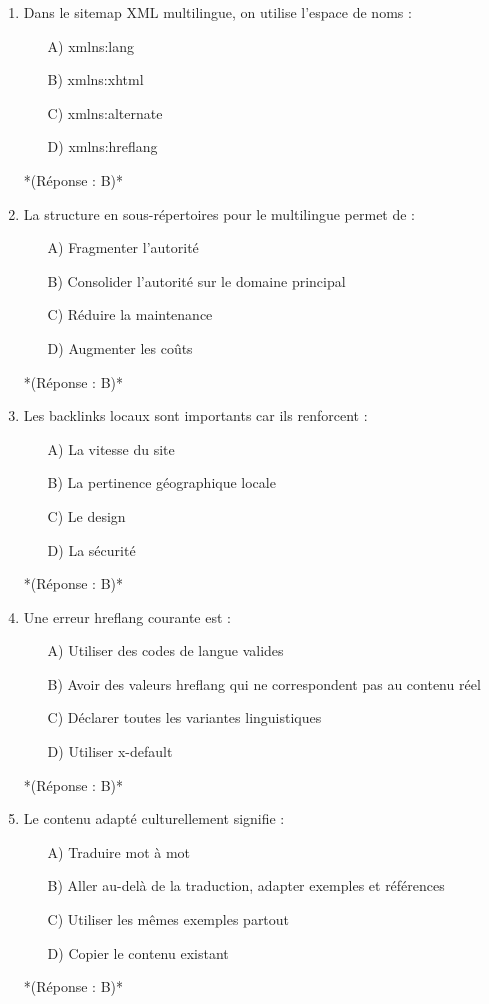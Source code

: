 \documentclass[12pt,a4paper,twoside]{report}
\begin{document}
\begin{enumerate}
\item Dans le sitemap XML multilingue, on utilise l'espace de noms :
\begin{itemize}
\item[A)] xmlns:lang
\item[B)] xmlns:xhtml
\item[C)] xmlns:alternate
\item[D)] xmlns:hreflang
\end{itemize}
*(Réponse : B)*

\item La structure en sous-répertoires pour le multilingue permet de :
\begin{itemize}
\item[A)] Fragmenter l'autorité
\item[B)] Consolider l'autorité sur le domaine principal
\item[C)] Réduire la maintenance
\item[D)] Augmenter les coûts
\end{itemize}
*(Réponse : B)*

\item Les backlinks locaux sont importants car ils renforcent :
\begin{itemize}
\item[A)] La vitesse du site
\item[B)] La pertinence géographique locale
\item[C)] Le design
\item[D)] La sécurité
\end{itemize}
*(Réponse : B)*

\item Une erreur hreflang courante est :
\begin{itemize}
\item[A)] Utiliser des codes de langue valides
\item[B)] Avoir des valeurs hreflang qui ne correspondent pas au contenu réel
\item[C)] Déclarer toutes les variantes linguistiques
\item[D)] Utiliser x-default
\end{itemize}
*(Réponse : B)*

\item Le contenu adapté culturellement signifie :
\begin{itemize}
\item[A)] Traduire mot à mot
\item[B)] Aller au-delà de la traduction, adapter exemples et références
\item[C)] Utiliser les mêmes exemples partout
\item[D)] Copier le contenu existant
\end{itemize}
*(Réponse : B)*


\end{enumerate}
\end{document}
